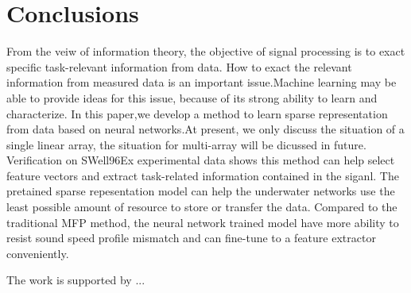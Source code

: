 \section{Conclusions}
From the veiw of information theory, the objective of signal processing is to exact specific task-relevant information from data.
How to exact the relevant information from measured data is an important issue.Machine learning may be able to provide ideas for this issue, because of its strong ability to learn and characterize.
In this paper,we develop a method to learn sparse representation from data based on neural networks.At present, we only discuss the situation of a single linear array, the situation for multi-array will be dicussed in future.
Verification on SWell96Ex experimental data shows this method can help select feature vectors and extract task-related information contained in the siganl. The pretained sparse repesentation model can help the underwater networks use the least possible amount of resource to store or transfer the data. Compared to the traditional MFP method, the neural network trained model have more ability to resist sound speed profile mismatch and can fine-tune to a feature extractor conveniently.

\begin{acks}
The work is supported by ...

\end{acks}
